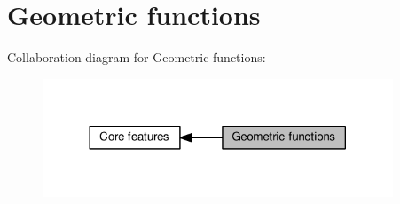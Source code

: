 \hypertarget{group__core__func__geometric}{}\section{Geometric functions}
\label{group__core__func__geometric}
Collaboration diagram for Geometric functions\+:
\nopagebreak
\begin{figure}[H]
\begin{center}
\leavevmode
\includegraphics[width=296pt]{d6/da9/group__core__func__geometric}
\end{center}
\end{figure}
